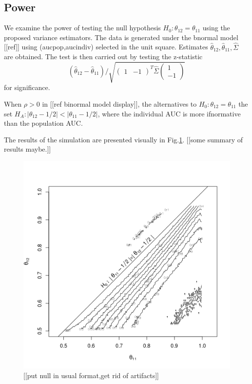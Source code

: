 \message{ !name(manuscript.tex)}\documentclass[12pt]{article}
\DeclareMathOperator{\AUC}{AUC}
\newcommand{\cind}{\perp \!\!\! \perp}
\newcommand{\aucindiv}{\theta_{11}}%
\newcommand{\aucpop}{\theta_{12}}%
\newcommand{\aucindivhat}{\hat{\theta}_{11}}%
\newcommand{\aucpophat}{\hat{\theta}_{12}}%
\begin{document}
\subsection{Power}

We examine the power of testing the null hypothesis
$H_0:\aucpop=\aucindiv$ using the proposed variance estimators. The
data is generated under the bnormal model [[ref]] using
(aucpop,aucindiv) selected in the unit square. Estimates
$\aucpophat,\aucindivhat,\hat\Sigma$ are obtained. The test is then
carried out by testing the z-statistic
$$
(\aucpophat-\aucindivhat) /
\sqrt{\begin{pmatrix}1&-1\end{pmatrix}^T\hat\Sigma\begin{pmatrix}1\\-1\end{pmatrix}}
$$
for significance.

When $\rho>0$ in [[ref
binormal model display]], the alternatives to $H_0:\aucpop=\aucindiv$
the set $H_A:|\aucpop-1/2|<|\aucindiv-1/2|$, where the individual AUC
is more ifnormative than the population AUC.


The results of the simulation are presented visually in Fig.\ref{fig:power}. [[some summary of results maybe.]]

\begin{figure}
  \centering
  \includegraphics{../sim/211120/211120.png}
  \caption{[[put null in usual format,get rid of artifacts]]}  \label{fig:power}
\end{figure}
\end{document}
